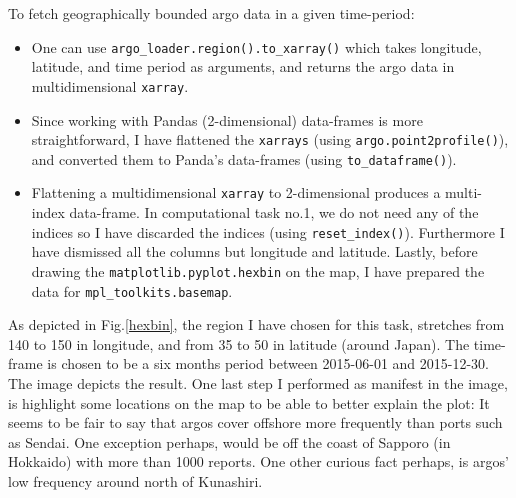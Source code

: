 \documentclass[12pt]{article}
\begin{document}
To fetch geographically bounded argo data in a given time-period:
 \begin{itemize}
     \item One can use \verb|argo_loader.region().to_xarray()| which takes longitude, latitude, and time period as arguments, and 
     returns the argo data in multidimensional \verb|xarray|.
     \item Since working
     with Pandas (2-dimensional) data-frames is more straightforward, 
     I have flattened the \verb|xarrays| 
     (using \verb|argo.point2profile()|),
     and converted them to Panda's data-frames 
     (using \verb|to_dataframe()|).
     \item Flattening a multidimensional \verb|xarray| to 
     2-dimensional produces a multi-index data-frame. 
     In computational task no.1, 
     we do not need any of the indices so I have discarded 
     the indices (using \verb|reset_index()|). Furthermore I 
     have dismissed all
     the columns but longitude and latitude. 
     Lastly, before 
     drawing the \verb|matplotlib.pyplot.hexbin| on the map, I have
     prepared the data for \verb|mpl_toolkits.basemap|.
 \end{itemize}

 As depicted in Fig.\ref{hexbin}, the region I have chosen for 
 this task, stretches from 140 to 150 
 in longitude, and from 35 to 50 in latitude (around Japan). 
 The time-frame is chosen to be a six months period between 
 2015-06-01 and 2015-12-30. The image depicts the result. One
 last step I performed as manifest in the image, 
 is highlight some locations on the map 
 to be able to better explain the plot: It seems to be
 fair to say that argos cover offshore more frequently 
 than ports such as Sendai. One exception perhaps, would be
 off the coast of Sapporo (in Hokkaido) with more than 1000 
 reports. One other curious fact perhaps, is argos' low frequency around 
 north of Kunashiri.    
\end{document}
